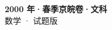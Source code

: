 \documentclass[zihao=-4, a4paper]{ctexart}
\begin{document}
\begin{center}
  {\Large\bfseries 2000 年·春季京皖卷·文科}\\[4pt]
  {\large 数学 · 试题版}
\end{center}
\medskip
{}

\end{document}
